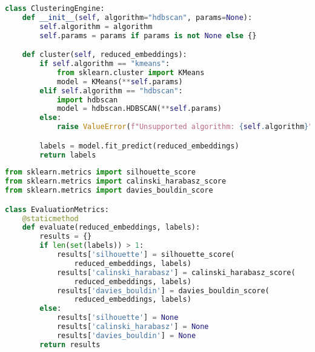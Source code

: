 \begin{lstlisting}[language=Python, caption={\texttt{clustering\_engine.py}}, label={prco:clustering-engine}]
class ClusteringEngine:
    def __init__(self, algorithm="hdbscan", params=None):
        self.algorithm = algorithm
        self.params = params if params is not None else {}

    def cluster(self, reduced_embeddings):
        if self.algorithm == "kmeans":
            from sklearn.cluster import KMeans
            model = KMeans(**self.params)
        elif self.algorithm == "hdbscan":
            import hdbscan
            model = hdbscan.HDBSCAN(**self.params)
        else:
            raise ValueError(f"Unsupported algorithm: {self.algorithm}")

        labels = model.fit_predict(reduced_embeddings)
        return labels
\end{lstlisting}

\begin{lstlisting}[language=Python, caption={\texttt{evaluation\_metrics.py}}, label={prco:evaluation-metrics}]
from sklearn.metrics import silhouette_score
from sklearn.metrics import calinski_harabasz_score
from sklearn.metrics import davies_bouldin_score

class EvaluationMetrics:
    @staticmethod
    def evaluate(reduced_embeddings, labels):
        results = {}
        if len(set(labels)) > 1:
            results['silhouette'] = silhouette_score(
                reduced_embeddings, labels)
            results['calinski_harabasz'] = calinski_harabasz_score(
                reduced_embeddings, labels)
            results['davies_bouldin'] = davies_bouldin_score(
                reduced_embeddings, labels)
        else:
            results['silhouette'] = None
            results['calinski_harabasz'] = None
            results['davies_bouldin'] = None
        return results
\end{lstlisting}

